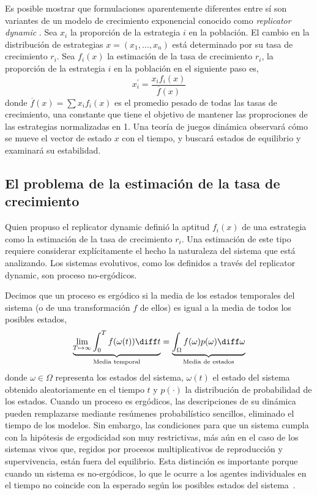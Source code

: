 \documentclass[a4paper,10pt]{article}
\begin{document}
Es posible mostrar que formulaciones aparentemente diferentes entre sí son variantes de un modelo de crecimiento exponencial conocido como \emph{replicator dynamic} \cite{taylor1978-replicatorDynamic, schuster1983-replicatorDynamics}.
Sea $x_i$ la proporción de la estrategia $i$ en la población.
El cambio en la distribución de estrategias $x = (x_1 , \dots , x_n)$ está determinado por su tasa de crecimiento $r_i$.
Sea $f_i(x)$ la estimación de la tasa de crecimiento $r_i$, la proporción de la estrategia $i$ en la población en el siguiente paso es,    
\begin{equation} \label{eq:replicator_dynamic}
x_i^\prime = \frac{x_i f_i(x)}{\overline{f}(x)}
\end{equation}
donde $\overline{f}(x)=\sum x_i f_i(x)$ es el promedio pesado de todas las tasas de crecimiento, una constante que tiene el objetivo de mantener las proprociones de las estrategias normalizadas en 1.
Una teoría de juegos dinámica observará cómo se mueve el vector de estado $x$ con el tiempo, y buscará estados de equilibrio y examinará su estabilidad.

\subsection{El problema de la estimación de la tasa de crecimiento}

Quien propuso el replicator dynamic definió la aptitud $f_i(x)$ de una estrategia como la estimación de la tasa de crecimiento $r_i$.
Una estimación de este tipo requiere considerar explícitamente el hecho la naturaleza del sistema que está analizando. 
Los sistemas evolutivos, como los definidos a través del replicator dynamic, son proceso no-ergódicos.

Decimos que un proceso es ergódico si la media de los estados temporales del sistema (o de una transformación $f$ de ellos) es igual a la media de todos los posibles estados,
\begin{equation}
 \underbrace{\lim_{T \mapsto \infty} \int_0^T f(\omega(t)) \diff t}_{\text{Media temporal}}  = \underbrace{\int_{\Omega} f(\omega)p(\omega) \diff\omega}_{\text{Media de estados}}
\end{equation}
donde $\omega \in \Omega$ representa los estados del sistema, $\omega(t)$ el estado del sistema obtenido aleatoriamente en el tiempo $t$ y $p(\cdot)$ la distribución de probabilidad de los estados.
Cuando un proceso es ergódicos, las descripciones de su dinámica pueden remplazarse mediante resúmenes probabilístico sencillos, eliminado el tiempo de los modelos.
Sin embargo, las condiciones para que un sistema cumpla con la hipótesis de ergodicidad son muy restrictivas, más aún en el caso de los sistemas vivos que, regidos por procesos multiplicativos de reproducción y supervivencia, están fuera del equilibrio.
Esta distinción es importante porque cuando un sistema es no-ergódicos, lo que le ocurre a los agentes individuales en el tiempo no coincide con la esperado según los posibles estados del sistema~\cite{peters2019-ergodicityEconomics}.
\end{document}
